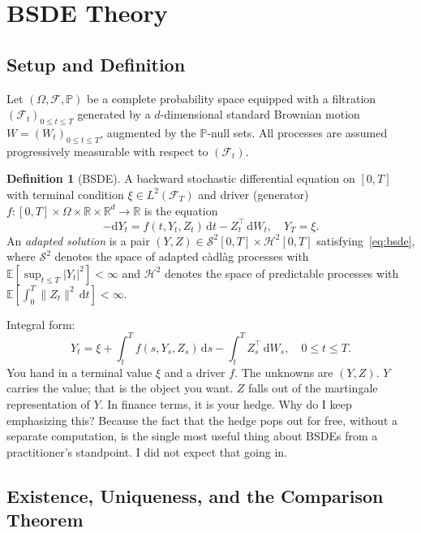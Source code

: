 \documentclass[11pt]{article}
\theoremstyle{definition}
\newtheorem{definition}[theorem]{Definition}
\theoremstyle{remark}
\newcommand{\R}{\mathbb{R}}
\newcommand{\E}{\mathbb{E}}
\newcommand{\Prob}{\mathbb{P}}
\newcommand{\F}{\mathcal{F}}
\newcommand{\dt}{\,\mathrm{d}t}
\newcommand{\dW}{\,\mathrm{d}W}
\newcommand{\ds}{\,\mathrm{d}s}
\newcommand{\norm}[1]{\lVert #1 \rVert}
\begin{document}
\section{BSDE Theory}\label{sec:theory}

\subsection{Setup and Definition}

Let $(\Omega, \F, \Prob)$ be a complete probability space equipped with a
filtration $(\F_t)_{0 \le t \le T}$ generated by a $d$-dimensional standard
Brownian motion $W = (W_t)_{0 \le t \le T}$, augmented by the $\Prob$-null
sets.  All processes are assumed progressively measurable with respect to
$(\F_t)$.

\begin{definition}[BSDE]\label{def:bsde}
A backward stochastic differential equation on $[0,T]$ with terminal condition
$\xi \in L^2(\F_T)$ and driver (generator)
$f \colon [0,T] \times \Omega \times \R \times \R^d \to \R$ is the equation
\begin{equation}\label{eq:bsde}
  -\mathrm{d}Y_t = f(t, Y_t, Z_t)\dt - Z_t^\top \dW_t, \quad Y_T = \xi.
\end{equation}
An \emph{adapted solution} is a pair $(Y, Z) \in \mathcal{S}^2[0,T] \times
\mathcal{H}^2[0,T]$ satisfying~\eqref{eq:bsde}, where $\mathcal{S}^2$ denotes
the space of adapted c\`{a}dl\`{a}g processes with
$\E[\sup_{t \le T} |Y_t|^2] < \infty$ and $\mathcal{H}^2$ denotes the space
of predictable processes with $\E[\int_0^T \norm{Z_t}^2 \dt] < \infty$.
\end{definition}

Integral form:
\begin{equation}\label{eq:bsde_integral}
  Y_t = \xi + \int_t^T f(s, Y_s, Z_s)\ds - \int_t^T Z_s^\top \dW_s,
  \quad 0 \le t \le T.
\end{equation}
You hand in a terminal value $\xi$ and a driver $f$. The unknowns are
$(Y, Z)$. $Y$ carries the value; that is the object you want.
$Z$ falls out of the martingale representation of $Y$.
In finance terms, it is your hedge. Why do I keep emphasizing this?
Because the fact that the hedge pops out for free, without a separate
computation, is the single most useful thing about BSDEs from a
practitioner's standpoint. I did not expect that going in.

\subsection{Existence, Uniqueness, and the Comparison Theorem}
\end{document}
